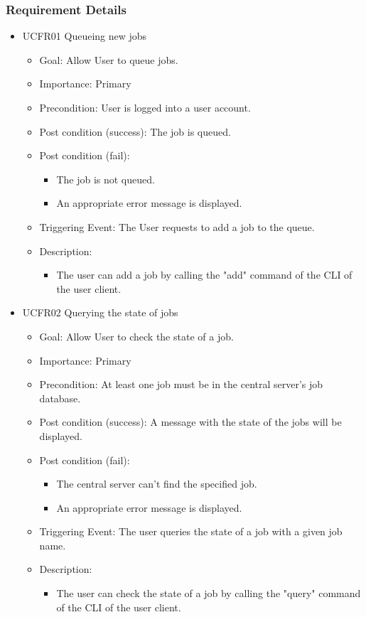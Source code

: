   \subsubsection{Requirement Details} 
    \begin{itemize}
    \item UCFR01 Queueing new jobs
    \begin{itemize}
      \item Goal: Allow User to queue jobs.
      \item Importance: Primary
      \item Precondition: User is logged into a user account.
      \item Post condition (success): The job is queued.
      \item Post condition (fail):
      \begin{itemize}
        \item The job is not queued.
        \item An appropriate error message is displayed.
      \end{itemize}
      \item Triggering Event: The User requests to add a job to the queue.
      \item Description:
      \begin{itemize}
        \item  The user can add a job by calling the "add" command of the CLI of the user client.
      \end{itemize}
    \end{itemize}
    
    \item UCFR02 Querying the state of jobs
    \begin{itemize}
      \item Goal: Allow User to check the state of a job.
      \item Importance: Primary
      \item Precondition: At least one job must be in the central server's job database.
      \item Post condition (success): A message with the state of the jobs will be displayed.
      \item Post condition (fail):
      \begin{itemize}
        \item The central server can't find the specified job.
        \item An appropriate error message is displayed.
      \end{itemize}
      \item Triggering Event: The user queries the state of a job with a given job name.
      \item Description:
      \begin{itemize}
        \item The user can check the state of a job by calling the "query" command of the CLI of the user client.
      \end{itemize}
    \end{itemize}
    

\end{itemize}
